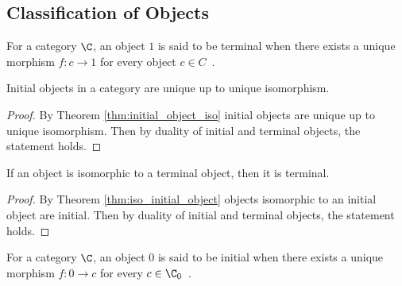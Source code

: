 \subsection{Classification of Objects}

\begin{definition}
  For a category $\C$, an object $1$ is said to be terminal when there exists a
  unique morphism $f: c\to 1$ for every object $c\in
  C$~\parencite[p.~48]{leinster:basic_category_theory}.
\end{definition}

\begin{theorem}
  Initial objects in a category are unique up to unique isomorphism.

  \begin{proof}
    By Theorem \ref{thm:initial_object_iso} initial objects are unique up to
    unique isomorphism. Then by duality of initial and terminal objects, the
    statement holds.
  \end{proof}
\end{theorem}

\begin{theorem}
  If an object is isomorphic to a terminal object, then it is terminal.

  \begin{proof}
    By Theorem \ref{thm:iso_initial_object} objects isomorphic to an initial
    object are initial. Then by duality of initial and terminal objects, the
    statement holds.
  \end{proof}
\end{theorem}

\begin{definition}
  For a category $\C$, an object $0$ is said to be initial when there exists a
  unique morphism $f: 0\to c$ for every $c\in
  \C_0$~\parencite[p.~48]{leinster:basic_category_theory}.
\end{definition}

